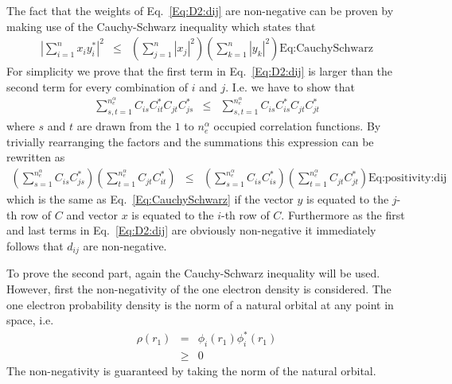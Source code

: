 \documentclass[pra,nofootinbib]{revtex4-1}
\newcommand{\dlabel}[1]{\text{#1}\label{#1}}
\begin{document}
The fact that the weights of Eq.~\ref{Eq:D2:dij} are non-negative can be
proven by making use of the Cauchy-Schwarz inequality which states that
\begin{eqnarray}
  \left|\sum_{i=1}^n x_i y_i^*\right|^2
  &\leq& \left(\sum_{j=1}^n|x_j|^2\right)\left(\sum_{k=1}^n|y_k|^2\right)
  \dlabel{Eq:CauchySchwarz}
\end{eqnarray}
For simplicity we prove that the first term in Eq.~\ref{Eq:D2:dij} is
larger than the second term for every combination of $i$ and $j$.
I.e. we have to show that
\begin{eqnarray}
  \sum_{s,t=1}^{n_e^\alpha} C_{is}C^*_{it}C_{jt}C^*_{js} &\leq&
  \sum_{s,t=1}^{n_e^\alpha} C_{is}C^*_{is}C_{jt}C^*_{jt}
\end{eqnarray}
where $s$ and $t$ are drawn from the $1$ to $n_e^\alpha$ occupied correlation 
functions.
By trivially rearranging the factors and the summations this expression can be
rewritten as
\begin{eqnarray}
  \left(\sum_{s=1}^{n_e^\alpha}C_{is}C^*_{js}\right)
  \left(\sum_{t=1}^{n_e^\alpha}C_{jt}C^*_{it}\right) &\leq&
  \left(\sum_{s=1}^{n_e^\alpha}C_{is}C^*_{is}\right)
  \left(\sum_{t=1}^{n_e^\alpha}C_{jt}C^*_{jt}\right)
  \dlabel{Eq:positivity:dij}
\end{eqnarray}
which is the same as Eq.~\ref{Eq:CauchySchwarz} if the vector $y$ is equated to
the $j$-th row of $C$ and vector $x$ is equated to the $i$-th row of $C$.
Furthermore as the first and last terms in Eq.~\ref{Eq:D2:dij} are obviously
non-negative it immediately follows that $d_{ij}$ are non-negative.


To prove the second part, again the Cauchy-Schwarz inequality will be used.
However, first the non-negativity of the one electron density is considered.
The one electron probability density is the norm of a natural orbital at 
any point in space, i.e.
\begin{eqnarray}
  \rho(r_1)
  &=& \phi_i(r_1)\phi_i^*(r_1) \\
  &\ge& 0
\end{eqnarray}
The non-negativity is guaranteed by taking the norm of the natural orbital.
\end{document}
